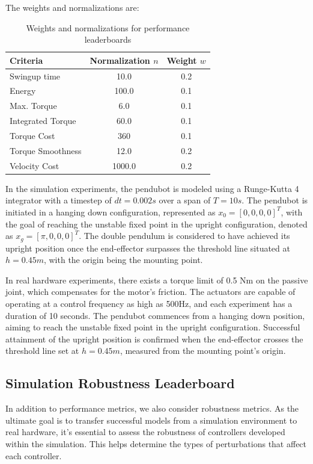 The weights and normalizations are:
\begin{table}[H]
  \centering
  \begin{tabular}{lcc}
    \hline
    Criteria & Normalization \(\mathit{n}\) & Weight \(\mathit{w}\) \\
    \hline
    Swingup time & 10.0 & 0.2 \\
    Energy & 100.0 & 0.1 \\
    Max. Torque & 6.0 & 0.1 \\
    Integrated Torque & 60.0 & 0.1 \\
    Torque Cost & 360 & 0.1 \\
    Torque Smoothness & 12.0 & 0.2 \\
    Velocity Cost & 1000.0 & 0.2 \\
    \hline
  \end{tabular}
  \caption{Weights and normalizations for performance leaderboards}
  \label{tab:performance}
\end{table}

In the simulation experiments, the pendubot is modeled using a Runge-Kutta 4 integrator with a timestep of \(dt=0.002s\) over a span of \(T=10s\). The pendubot is initiated in a hanging down configuration, represented as \(x_0 = [0, 0, 0, 0]^T\), with the goal of reaching the unstable fixed point in the upright configuration, denoted as \(x_g = [\pi, 0, 0, 0]^T\). The double pendulum is considered to have achieved its upright position once the end-effector surpasses the threshold line situated at \(h=0.45m\), with the origin being the mounting point.

In real hardware experiments, there exists a torque limit of 0.5 Nm on the passive joint, which compensates for the motor's friction. The actuators are capable of operating at a control frequency as high as 500Hz, and each experiment has a duration of 10 seconds. The pendubot commences from a hanging down position, aiming to reach the unstable fixed point in the upright configuration. Successful attainment of the upright position is confirmed when the end-effector crosses the threshold line set at \(h=0.45m\), measured from the mounting point's origin.

\subsection{Simulation Robustness Leaderboard}
In addition to performance metrics, we also consider robustness metrics. As the ultimate goal is to transfer successful models from a simulation environment to real hardware, it's essential to assess the robustness of controllers developed within the simulation. This helps determine the types of perturbations that affect each controller.

